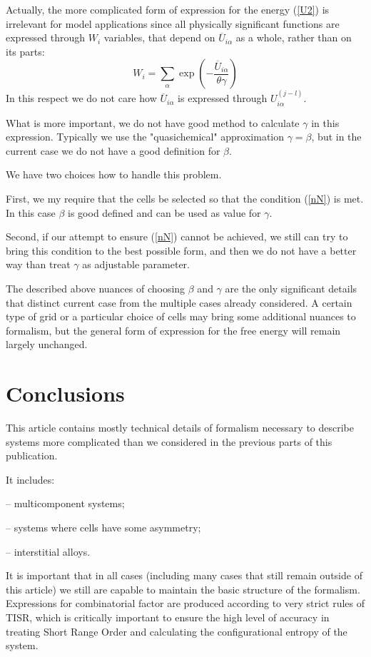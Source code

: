 \documentclass[12pt,abstract]{scrartcl}
\begin{document}
Actually, the more complicated form of expression for the energy (\ref{U2}) is irrelevant for model applications since all physically significant functions are expressed through $W_i$ variables, that depend on $\overline{U}_{i \alpha}$ as a whole, rather than on its parts:
\begin{equation} \label{W2}
 W_i = \sum_\alpha \exp \left(- {\frac{ \overline{U}_{i \alpha}}{\theta\gamma }}\right)
\end{equation} 
In this respect we do not care how $\overline{U}_{i \alpha}$ is expressed through $ U_{i \alpha}^{(j-l)}$.

What is more important, we do not have good method to calculate $\gamma$ in this expression. 
Typically  we use the "quasichemical" approximation $\gamma = \beta$, but in the current case we do not have a good  definition for $\beta$.

We have two choices how to handle this problem.

First, we my require that the cells be selected so that the condition (\ref{nN}) is met.
 In this case $\beta$ is good defined and can be used as value for $\gamma$.

Second, if our attempt to ensure  (\ref{nN}) cannot be achieved, we still can try to bring this condition to the best possible form, and then we do not have a better way than treat $\gamma$ as adjustable parameter.

The described above nuances of choosing $\beta$ and $\gamma$ are the only significant details that distinct current case from the multiple cases already considered. 
A certain type of grid or a particular choice of cells may bring some additional nuances to formalism, but the general form of expression for the free energy will remain largely unchanged.


\section{Conclusions}

This article contains mostly technical details of formalism necessary to describe systems more complicated than we considered in the previous parts of this publication.


It includes:

 -- multicomponent systems;

-- systems where cells have some asymmetry;

-- interstitial alloys.

It is important that in all cases (including many cases that still remain outside of this article) we still are capable to maintain the  basic  structure of the formalism. 
Expressions for combinatorial factor are produced according to very strict rules of TISR, which is critically important to ensure the high level of accuracy in treating Short Range Order and calculating  the configurational entropy of the system.
\end{document}
